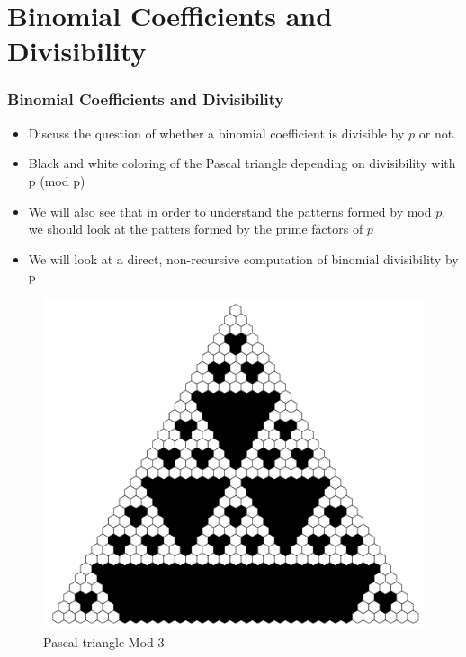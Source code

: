 \documentclass{beamer}
\begin{document}
\section{Binomial Coefficients and Divisibility}

\begin{frame}
    \frametitle{Binomial Coefficients and Divisibility}
    \begin{itemize}
        \item Discuss the question of whether a binomial coefficient is divisible by $p$ or not. 
        \item Black and white coloring of the Pascal triangle depending on divisibility with p (mod p)
        \item We will also see that in order to understand the patterns formed by mod $p$, we should look at the patters formed by the prime factors of $p$ 
        \item We will look at a direct, non-recursive computation of binomial divisibility by p
    \end{itemize}
\end{frame}

\begin{frame}
    \begin{figure}
        \includegraphics[scale=0.36]{PascalMod3.pdf}
        \caption{Pascal triangle Mod 3}
    \end{figure}
\end{frame}
\end{document}

